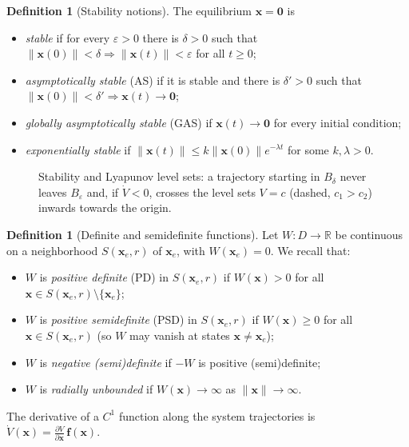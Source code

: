 \documentclass[11pt,a4paper]{article}
\newcommand{\R}{\mathbb{R}}
\theoremstyle{plain}
\theoremstyle{definition}
\newtheorem{definition}[theorem]{Definition}
\theoremstyle{remark}
\begin{document}
\begin{definition}[Stability notions]
The equilibrium $\bm x=\bm 0$ is
\begin{itemize}[leftmargin=*,nosep]
\item \emph{stable} if for every $\varepsilon>0$ there is $\delta>0$ such that $\|\bm x(0)\|<\delta\Rightarrow\|\bm x(t)\|<\varepsilon$ for all $t\ge0$;
\item \emph{asymptotically stable} (AS) if it is stable and there is $\delta'>0$ such that $\|\bm x(0)\|<\delta'\Rightarrow\bm x(t)\to\bm 0$;
\item \emph{globally asymptotically stable} (GAS) if $\bm x(t)\to\bm 0$ for every initial condition;
\item \emph{exponentially stable} if $\|\bm x(t)\|\le k\|\bm x(0)\|e^{-\lambda t}$ for some $k,\lambda>0$.
\end{itemize}
\end{definition}

\begin{figure}[ht]
\centering
{}
\caption{Stability and Lyapunov level sets: a trajectory starting in $B_\delta$ never leaves $B_\varepsilon$ and, if $\dot V<0$, crosses the level sets $V=c$ (dashed, $c_1>c_2$) inwards towards the origin.}
\end{figure}

\begin{definition}[Definite and semidefinite functions]
Let $W:D\to\R$ be continuous on a neighborhood $S(\bm x_e,r)$ of $\bm x_e$, with $W(\bm x_e)=0$. We recall that:
\begin{itemize}[leftmargin=*,nosep]
\item $W$ is \emph{positive definite} (PD) in $S(\bm x_e,r)$ if $W(\bm x)>0$ for all $\bm x\in S(\bm x_e,r)\setminus\{\bm x_e\}$;
\item $W$ is \emph{positive semidefinite} (PSD) in $S(\bm x_e,r)$ if $W(\bm x)\ge0$ for all $\bm x\in S(\bm x_e,r)$ (so $W$ may vanish at states $\bm x\ne\bm x_e$);
\item $W$ is \emph{negative (semi)definite} if $-W$ is positive (semi)definite;
\item $W$ is \emph{radially unbounded} if $W(\bm x)\to\infty$ as $\|\bm x\|\to\infty$.
\end{itemize}
The derivative of a $C^1$ function along the system trajectories is $\dot V(\bm x)=\frac{\partial V}{\partial\bm x}\,\bm f(\bm x)$.
\end{definition}
\end{document}
